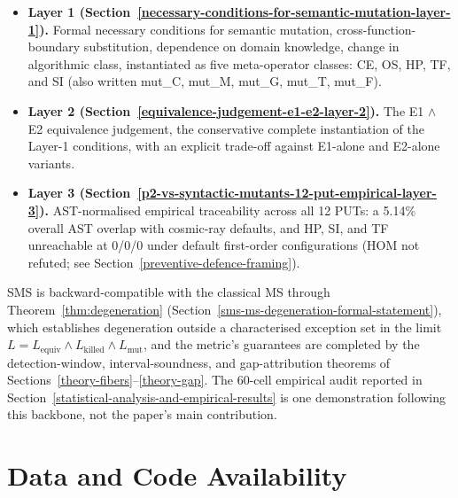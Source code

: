 \documentclass[manuscript,screen,review]{acmart}
\begin{document}
\begin{itemize}

\item
  \textbf{Layer 1 (Section~\ref{necessary-conditions-for-semantic-mutation-layer-1}).} Formal necessary conditions for semantic
  mutation, cross-function-boundary substitution, dependence on domain
  knowledge, change in algorithmic class, instantiated as five
  meta-operator classes: CE, OS, HP, TF, and SI (also written mut\_C,
  mut\_M, mut\_G, mut\_T, mut\_F).
\item
  \textbf{Layer 2 (Section~\ref{equivalence-judgement-e1-e2-layer-2}).} The E1 $\wedge$ E2 equivalence judgement, the
  conservative complete instantiation of the Layer-1 conditions, with an
  explicit trade-off against E1-alone and E2-alone variants.
\item
  \textbf{Layer 3 (Section~\ref{p2-vs-syntactic-mutants-12-put-empirical-layer-3}).} AST-normalised empirical traceability across
  all 12 PUTs: a 5.14\% overall AST overlap with cosmic-ray defaults,
  and HP, SI, and TF unreachable at 0/0/0 under default first-order
  configurations (HOM not refuted; see Section~\ref{preventive-defence-framing}).
\end{itemize}

SMS is backward-compatible with the classical MS through
Theorem~\ref{thm:degeneration} (Section~\ref{sms-ms-degeneration-formal-statement}), which establishes degeneration outside a
characterised exception set in the limit
$L = L_{\mathrm{equiv}} \wedge L_{\mathrm{killed}} \wedge L_{\mathrm{mut}}$, and the metric's
guarantees are completed by the detection-window, interval-soundness,
and gap-attribution theorems of
Sections~\ref{theory-fibers}--\ref{theory-gap}. The 60-cell empirical
audit reported in Section~\ref{statistical-analysis-and-empirical-results} is one demonstration following this backbone, not
the paper's main contribution.

\section*{Data and Code Availability}\label{data-and-code-availability}
\end{document}
